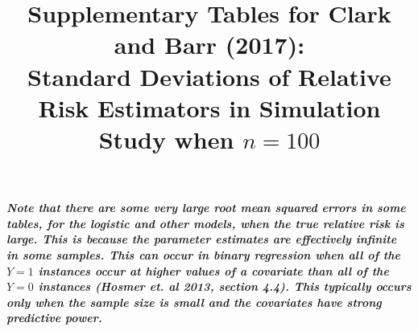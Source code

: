 \documentclass[12pt,a4paper]{article}
\date{}
\begin{document}
\title{Supplementary Tables for Clark and Barr (2017):  \\  
Standard Deviations of Relative Risk Estimators in Simulation Study when $n=100$ }


\maketitle



{\bf \it Note that there are some very large root mean squared errors in some tables, for the logistic and other models, when the true relative risk is large. This is because the parameter estimates are effectively infinite in some samples. This can occur in binary regression when all of the $Y=1$ instances occur at higher values of a covariate than all of the $Y=0$ instances (Hosmer et. al 2013, section 4.4). This typically occurs only when the sample size is small and the covariates have strong predictive power.}
\end{document}
